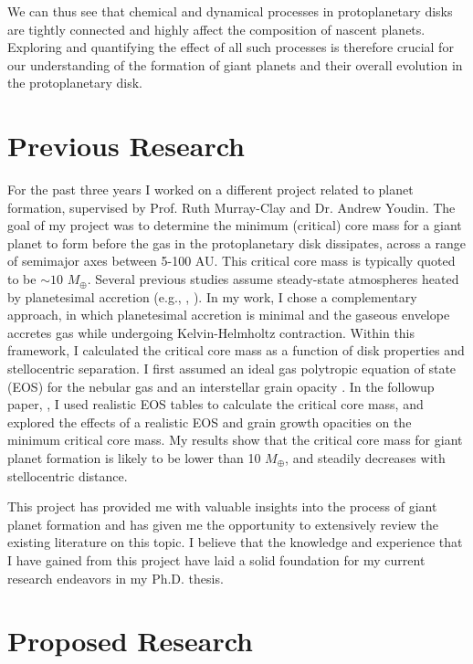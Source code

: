 \documentclass[manuscript]{aastex}
\begin{document}
We can thus see that chemical and dynamical processes in protoplanetary disks are tightly connected and highly affect the composition of nascent planets. Exploring and quantifying the effect of all such processes is therefore crucial for our understanding of the formation of giant planets and their overall evolution in the protoplanetary disk. 

\section{Previous Research}

For the past three years I worked on a different project related to planet formation, supervised by Prof. Ruth Murray-Clay and Dr. Andrew Youdin. The goal of my project was to determine the minimum (critical) core mass for a giant planet to form before the gas in the protoplanetary disk dissipates, across a range of semimajor axes between 5-100 AU. This critical core mass is typically quoted to be $\sim$$10$ $M_{\oplus}$. Several previous studies assume steady-state atmospheres heated by planetesimal accretion (e.g., \citealt{stevenson82}, \citealt{rafikov06}). In my work, I chose a complementary approach, in which planetesimal accretion is minimal and the gaseous envelope accretes gas while undergoing Kelvin-Helmholtz contraction. Within this framework, I calculated the critical core mass as a function of disk properties and stellocentric separation. I first assumed an ideal gas polytropic equation of state (EOS) for the nebular gas and an interstellar grain opacity \citep{piso14}. In the followup paper, \citet{piso15}, I used realistic EOS tables to calculate the critical core mass, and explored the effects of a realistic EOS and grain growth opacities on the minimum critical core mass. My results show that the critical core mass for giant planet formation is likely to be lower than 10 $M_{\oplus}$, and steadily decreases with stellocentric distance.

This project has provided me with valuable insights into the process of giant planet formation and has given me the opportunity to extensively review the existing literature on this topic. I believe that the knowledge and experience that I have gained from this project have laid a solid foundation for my current research endeavors in my Ph.D. thesis.


\section{Proposed Research}
\end{document}
